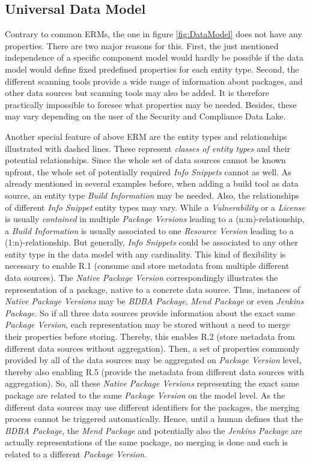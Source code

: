 \subsection{Universal Data Model}
Contrary to common ERMs, the one in figure \ref{fig:DataModel} does not have any properties. There are two major reasons for this. First, the just mentioned independence of a specific component model would hardly be possible if the data model would define fixed predefined properties for each entity type. Second, the different scanning tools provide a wide range of information about packages, and other data sources but scanning tools may also be added. It is therefore practically impossible to foresee what properties may be needed. Besides, these may vary depending on the user of the Security and Compliance Data Lake.\par
Another special feature of above ERM are the entity types and relationships illustrated with dashed lines. These represent \emph{classes of entity types} and their potential relationships. Since the whole set of data sources cannot be known upfront, the whole set of potentially required \emph{Info Snippets} cannot as well. As already mentioned in several examples before, when adding a build tool as data source, an entity type \emph{Build Information} may be needed. Also, the relationships of different \emph{Info Snippet} entity types may vary. While a \emph{Vulnerability} or a \emph{License} is usually \emph{contained} in multiple \emph{Package Versions} leading to a (n:m)-relationship, a \emph{Build Information} is usually associated to one \emph{Resource Version} leading to a (1:n)-relationship. But generally, \emph{Info Snippets} could be associated to any other entity type in the data model with any cardinality. This kind of flexibility is necessary to enable R.1 (consume and store metadata from multiple different data sources). The \emph{Native Package Version} correspondingly illustrates the representation of a package, native to a concrete data source. Thus, instances of \emph{Native Package Versions} may be \emph{BDBA Package}, \emph{Mend Package} or even \emph{Jenkins Package}. So if all three data sources provide information about the exact same \emph{Package Version}, each representation may be stored without a need to merge their properties before storing. Thereby, this enables R.2 (store metadata from different data sources without aggregation). Then, a set of properties commonly provided by all of the data sources may be aggregated on \emph{Package Version} level, thereby also enabling R.5 (provide the metadata from different data sources with aggregation). So, all these \emph{Native Package Versions} representing the exact same package are related to the same \emph{Package Version} on the model level. As the different data sources may use different identifiers for the packages, the merging process cannot be triggered automatically. Hence, until a human defines that the \emph{BDBA Package}, the \emph{Mend Package} and potentially also the \emph{Jenkins Package} are actually representations of the same package, no merging is done and each is related to a different \emph{Package Version}.\\

